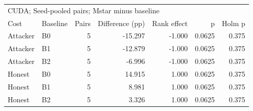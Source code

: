 \begin{tabular}{llrrrrr}
\toprule
\multicolumn{7}{l}{CUDA; Seed-pooled pairs; Mstar minus baseline} \\
Cost & Baseline & Pairs & Difference (pp) & Rank effect & p & Holm p \\
\midrule
Attacker & B0 & 5 & -15.297 & -1.000 & 0.0625 & 0.375 \\
Attacker & B1 & 5 & -12.879 & -1.000 & 0.0625 & 0.375 \\
Attacker & B2 & 5 & -6.996 & -1.000 & 0.0625 & 0.375 \\
Honest & B0 & 5 & 14.915 & 1.000 & 0.0625 & 0.375 \\
Honest & B1 & 5 & 8.981 & 1.000 & 0.0625 & 0.375 \\
Honest & B2 & 5 & 3.326 & 1.000 & 0.0625 & 0.375 \\
\bottomrule
\end{tabular}

